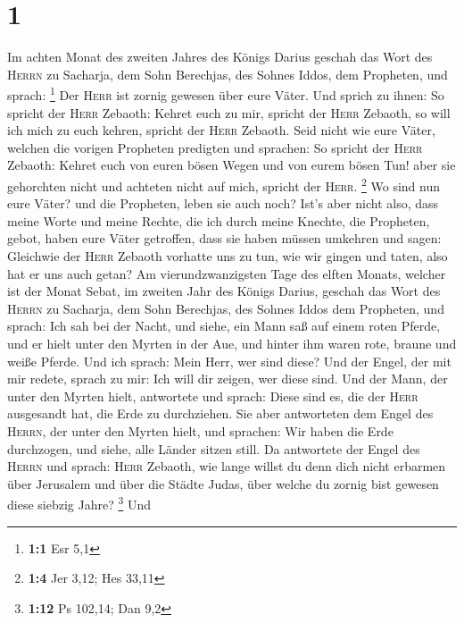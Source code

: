 \hypertarget{section}{%
\section{1}\label{section}}

 Im achten Monat des zweiten Jahres des Königs Darius
geschah das Wort des \textsc{Herrn} zu Sacharja, dem Sohn Berechjas, des
Sohnes Iddos, dem Propheten, und sprach: \footnote{\textbf{1:1} Esr 5,1}
 Der \textsc{Herr} ist zornig gewesen über eure Väter.
 Und sprich zu ihnen: So spricht der \textsc{Herr}
Zebaoth: Kehret euch zu mir, spricht der \textsc{Herr} Zebaoth, so will
ich mich zu euch kehren, spricht der \textsc{Herr} Zebaoth.
 Seid nicht wie eure Väter, welchen die vorigen Propheten
predigten und sprachen: So spricht der \textsc{Herr} Zebaoth: Kehret
euch von euren bösen Wegen und von eurem bösen Tun! aber sie gehorchten
nicht und achteten nicht auf mich, spricht der \textsc{Herr}.
\footnote{\textbf{1:4} Jer 3,12; Hes 33,11}  Wo sind nun
eure Väter? und die Propheten, leben sie auch noch?  Ist's
aber nicht also, dass meine Worte und meine Rechte, die ich durch meine
Knechte, die Propheten, gebot, haben eure Väter getroffen, dass sie
haben müssen umkehren und sagen: Gleichwie der \textsc{Herr} Zebaoth
vorhatte uns zu tun, wie wir gingen und taten, also hat er uns auch
getan?  Am vierundzwanzigsten Tage des elften Monats,
welcher ist der Monat Sebat, im zweiten Jahr des Königs Darius, geschah
das Wort des \textsc{Herrn} zu Sacharja, dem Sohn Berechjas, des Sohnes
Iddos dem Propheten, und sprach:  Ich sah bei der Nacht,
und siehe, ein Mann saß auf einem roten Pferde, und er hielt unter den
Myrten in der Aue, und hinter ihm waren rote, braune und weiße Pferde.
 Und ich sprach: Mein Herr, wer sind diese? Und der Engel,
der mit mir redete, sprach zu mir: Ich will dir zeigen, wer diese sind.
 Und der Mann, der unter den Myrten hielt, antwortete und
sprach: Diese sind es, die der \textsc{Herr} ausgesandt hat, die Erde zu
durchziehen.  Sie aber antworteten dem Engel des
\textsc{Herrn}, der unter den Myrten hielt, und sprachen: Wir haben die
Erde durchzogen, und siehe, alle Länder sitzen still.  Da
antwortete der Engel des \textsc{Herrn} und sprach: \textsc{Herr}
Zebaoth, wie lange willst du denn dich nicht erbarmen über Jerusalem und
über die Städte Judas, über welche du zornig bist gewesen diese siebzig
Jahre? \footnote{\textbf{1:12} Ps 102,14; Dan 9,2}  Und
